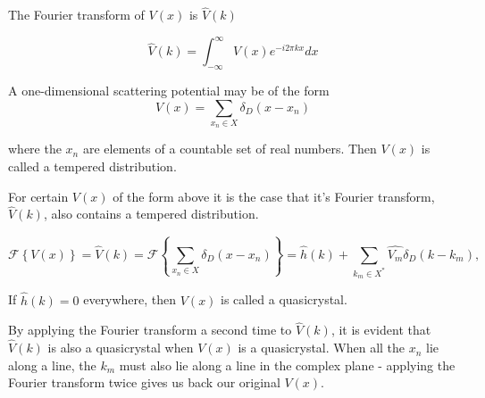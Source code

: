 \documentclass[11pt, oneside]{article}   	%
\begin{document}
The Fourier transform of $V(x)$ is $\hat{V}(k)$ 

\begin{equation}
\hat{V}(k) = \int_{-\infty}^{\infty}V(x)e^{-i2\pi kx}dx
\end{equation}

A one-dimensional scattering potential may be of the form 
\begin{equation}
V(x) = \sum_{x_n \in X}\delta_D(x - x_n)
\end{equation} 
 
where the $x_n$ are elements of a countable set of real numbers. 
Then $V(x)$ is called a tempered distribution.


 For certain $V(x)$ of the form above it is the case that it's Fourier transform, $\hat{V}(k)$, also contains a tempered distribution. 
  
\begin{equation}
 \label{eq: RiemannFourier}
 \mathcal{F}\left \{V(x)\right \} = \hat{V}(k) = \mathcal{F}\left \{ \sum_{x_n \in X}\delta_D(x - x_n) \right \} = \hat{h}(k) +  \sum_{k_m \in X^{*}} \hat{V_{m}} \delta_D(k - k_{m}),
\end{equation}

If $\hat{h}(k) = 0$ everywhere, then $V(x)$ is called a quasicrystal.

By applying the Fourier transform a second time to $\hat{V}(k)$, it is evident that $\hat{V}(k)$ is also a quasicrystal when $V(x)$ is a quasicrystal. When all the $x_n$ lie along a line, the $k_m$ must also lie along a line in the complex plane - applying the Fourier transform twice gives us back our original $V(x)$.








\end{document}
